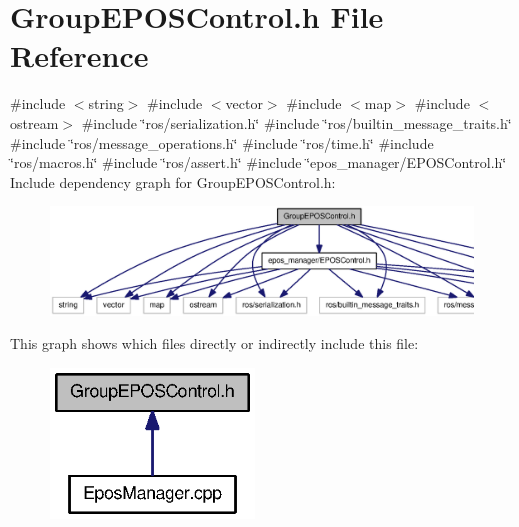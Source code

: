 \section{\-Group\-E\-P\-O\-S\-Control.\-h \-File \-Reference}
\label{GroupEPOSControl_8h}
{\ttfamily \#include $<$string$>$}\*
{\ttfamily \#include $<$vector$>$}\*
{\ttfamily \#include $<$map$>$}\*
{\ttfamily \#include $<$ostream$>$}\*
{\ttfamily \#include \char`\"{}ros/serialization.\-h\char`\"{}}\*
{\ttfamily \#include \char`\"{}ros/builtin\-\_\-message\-\_\-traits.\-h\char`\"{}}\*
{\ttfamily \#include \char`\"{}ros/message\-\_\-operations.\-h\char`\"{}}\*
{\ttfamily \#include \char`\"{}ros/time.\-h\char`\"{}}\*
{\ttfamily \#include \char`\"{}ros/macros.\-h\char`\"{}}\*
{\ttfamily \#include \char`\"{}ros/assert.\-h\char`\"{}}\*
{\ttfamily \#include \char`\"{}epos\-\_\-manager/\-E\-P\-O\-S\-Control.\-h\char`\"{}}\*
\-Include dependency graph for \-Group\-E\-P\-O\-S\-Control.\-h\-:
\nopagebreak
\begin{figure}[H]
\begin{center}
\leavevmode
\includegraphics[width=350pt]{GroupEPOSControl_8h__incl}
\end{center}
\end{figure}
\-This graph shows which files directly or indirectly include this file\-:
\nopagebreak
\begin{figure}[H]
\begin{center}
\leavevmode
\includegraphics[width=154pt]{GroupEPOSControl_8h__dep__incl}
\end{center}
\end{figure}
